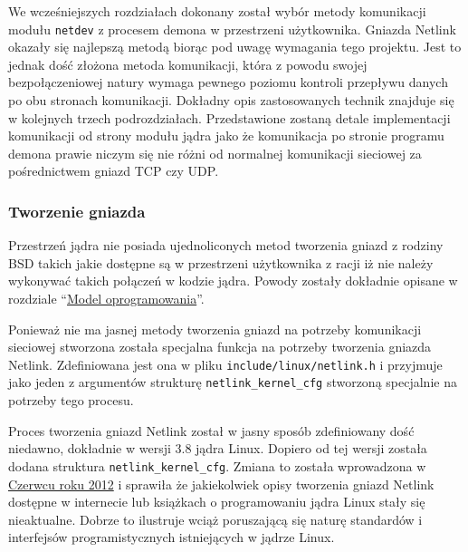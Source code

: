 \documentclass[10pt]{article}
\begin{document}

We wcześniejszych rozdziałach dokonany został wybór metody komunikacji
modułu \texttt{netdev} z procesem demona w przestrzeni użytkownika.
Gniazda Netlink okazały się najlepszą metodą biorąc pod uwagę wymagania
tego projektu. Jest to jednak dość złożona metoda komunikacji, która z
powodu swojej bezpołączeniowej natury wymaga pewnego poziomu kontroli
przepływu danych po obu stronach komunikacji. Dokładny opis
zastosowanych technik znajduje się w kolejnych trzech podrozdziałach.
Przedstawione zostaną detale implementacji komunikacji od strony modułu
jądra jako że komunikacja po stronie programu demona prawie niczym się
nie różni od normalnej komunikacji sieciowej za pośrednictwem gniazd TCP
czy UDP.

\subsubsection{Tworzenie gniazda}

Przestrzeń jądra nie posiada ujednoliconych metod tworzenia gniazd z rodziny BSD takich jakie dostępne są w przestrzeni użytkownika z racji iż nie należy wykonywać takich połączeń w kodzie jądra. Powody zostały dokładnie opisane w rozdziale ``\hyperref[model-oprogramowania]{Model oprogramowania}''.

Ponieważ nie ma jasnej metody tworzenia gniazd na potrzeby komunikacji sieciowej stworzona została specjalna funkcja na potrzeby tworzenia gniazda Netlink. Zdefiniowana jest ona w pliku \texttt{include/linux/netlink.h} i przyjmuje jako jeden z argumentów strukturę \texttt{netlink\_kernel\_cfg} stworzoną specjalnie na potrzeby tego procesu.

Proces tworzenia gniazd Netlink został w jasny sposób zdefiniowany dość niedawno, dokładnie w wersji 3.8 jądra Linux. Dopiero od tej wersji została dodana struktura \texttt{netlink\_kernel\_cfg}. Zmiana to została wprowadzona w \href{http://www.spinics.net/lists/netfilter-devel/msg22338.html}{Czerwcu roku 2012} i sprawiła że jakiekolwiek opisy tworzenia gniazd Netlink dostępne w internecie lub książkach o programowaniu jądra Linux stały się nieaktualne. Dobrze to ilustruje wciąż poruszającą się naturę standardów i interfejsów programistycznych istniejących w jądrze Linux.
\end{document}
